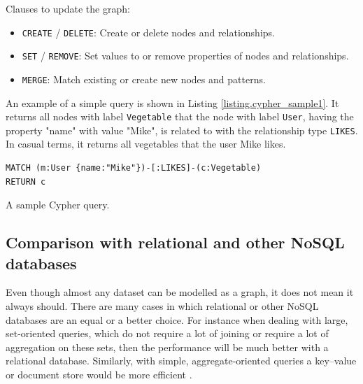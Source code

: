 \documentclass[12pt]{report}
\begin{document}
Clauses to update the graph:
\begin{itemize}
\item \texttt{CREATE} / \texttt{DELETE}: Create or delete nodes and relationships.
\item \texttt{SET} / \texttt{REMOVE}: Set values to or remove properties of nodes and relationships. 
\item \texttt{MERGE}: Match existing or create new nodes and patterns.
\end{itemize}

An example of a simple query is shown in Listing \ref{listing.cypher_sample1}. It returns all nodes with label \texttt{Vegetable} that the node with label \texttt{User}, having the property "name" with value "Mike", is related to with the relationship type \texttt{LIKES}. In casual terms, it returns all vegetables that the user Mike likes.

\begin{listing}
\begin{verbatim}
MATCH (m:User {name:"Mike"})-[:LIKES]-(c:Vegetable)
RETURN c
\end{verbatim}
\caption{A sample Cypher query.}
\label{listing.cypher_sample1}
\end{listing}

\subsection{Comparison with relational and other NoSQL databases}





Even though almost any dataset can be modelled as a graph, it does not mean it always should. There are many cases in which relational or other NoSQL databases are an equal or a better choice. For instance when dealing with large, set-oriented queries, which do not require a lot of joining or require a lot of aggregation on these sets, then the performance will be much better with a relational database. Similarly, with simple, aggregate-oriented queries a key--value or document store would be more efficient \cite{learning_neo4j}.
\end{document}
